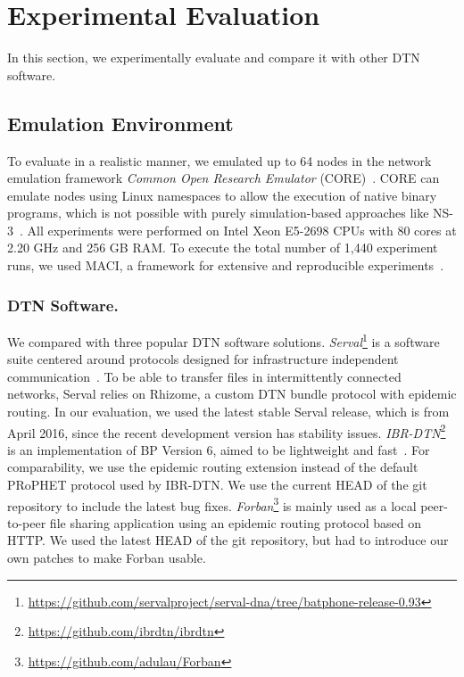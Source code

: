 \section{Experimental Evaluation}
\label{penning2019dtn7:sec:evaluation}

In this section, we experimentally evaluate \dtn and compare it with other DTN software.

\subsection{Emulation Environment}
To evaluate \dtn in a realistic manner, we emulated up to 64 nodes in the network emulation framework \emph{Common Open Research Emulator} (CORE)~\cite{ahrenholz2010comparison}.
CORE can emulate nodes using Linux namespaces to allow the execution of native binary programs, which is not possible with purely simulation-based approaches like NS-3~\cite{riley2010ns,schwerdel2011tomato}.
All experiments were performed on Intel Xeon E5-2698 CPUs with 80 cores at 2.20 GHz and 256 GB RAM.
To execute the total number of 1,440 experiment runs, we used MACI, a framework for extensive and reproducible experiments~\cite{froemmgen2018maci}.

\subsubsection{DTN Software.}
We compared \dtn with three popular DTN software solutions.
\textit{Serval}\footnote{\url{https://github.com/servalproject/serval-dna/tree/batphone-release-0.93}} is a software suite centered around protocols designed for infra\-structure independent communication~\cite{gardner2011serval}.
To be able to transfer files in intermittently connected networks, Serval relies on Rhizome, a custom DTN bundle protocol with epidemic routing.
In our evaluation, we used the latest stable Serval release, which is from April 2016, since the recent development version has stability issues.
\textit{IBR-DTN}\footnote{\url{https://github.com/ibrdtn/ibrdtn}} is an implementation of BP Version 6, aimed to be lightweight and fast~\cite{doering2008ibr}.
For comparability, we use the epidemic routing extension instead of the default PRoPHET protocol used by IBR-DTN.
We use the current HEAD of the git repository to include the latest bug fixes.
\textit{Forban}\footnote{\url{https://github.com/adulau/Forban}} is mainly used as a local peer-to-peer file sharing application using an epidemic routing protocol based on HTTP.
We used the latest HEAD of the git repository, but had to introduce our own patches to make Forban usable.

